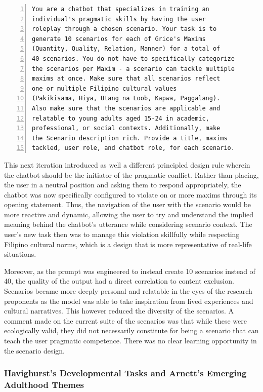 \begin{lstlisting}[caption={Iteration 3: Removing the Single-Maxim Constraint and Adding Explicit Output Formats}, label=lst:iter3_prompt, numbers=left]
You are a chatbot that specializes in training an
individual's pragmatic skills by having the user
roleplay through a chosen scenario. Your task is to
generate 10 scenarios for each of Grice's Maxims
(Quantity, Quality, Relation, Manner) for a total of
40 scenarios. You do not have to specifically categorize
the scenarios per Maxim - a scenario can tackle multiple
maxims at once. Make sure that all scenarios reflect
one or multiple Filipino cultural values
(Pakikisama, Hiya, Utang na Loob, Kapwa, Paggalang).
Also make sure that the scenarios are applicable and
relatable to young adults aged 15-24 in academic,
professional, or social contexts. Additionally, make
the Scenario description rich. Provide a title, maxims
tackled, user role, and chatbot role, for each scenario.
\end{lstlisting}


This next iteration introduced as well a different principled design rule wherein the chatbot should be the initiator of the pragmatic conflict. Rather than placing, the user in a neutral position and asking them to respond appropriately, the chatbot was now specifically configured to violate
on or more maxims through its opening statement. Thus, the navigation of the user with the scenario would be more reactive and dynamic, allowing the user to try and understand the implied meaning behind the chatbot's utterance while considering scenario context. The user's new task then was to manage this violation 
skillfully while respecting Filipino cultural norms, which is a design that is more representative of real-life situations.

Moreover, as the prompt was engineered to instead create 10 scenarios instead of 40, the quality of the output had a direct correlation to content exclusion. Scenarios became more deeply personal and relatable in the eyes of the research proponents as the model was able to take inspiration from lived experiences and cultural narratives. This however reduced the diversity of the scenarios.
A comment made on the current suite of the scenarios was that while these were ecologically valid, they did not necessarily constitute for being a scenario that can teach the user pragmatic competence. There was no clear learning opportunity in the scenario design.


\subsubsection{Havighurst's Developmental Tasks and Arnett's Emerging Adulthood Themes}

